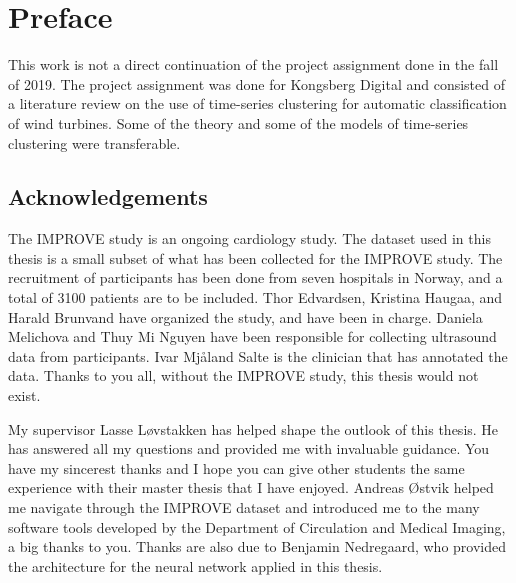 \section*{Preface}
%

This work is not a direct continuation of the project assignment done in the fall of 2019. The project assignment was done for Kongsberg Digital and consisted of a literature review on the use of time-series clustering for automatic classification of wind turbines. Some of the theory and some of the models of time-series clustering were transferable.

\subsection*{Acknowledgements}

The IMPROVE study is an ongoing cardiology study. The dataset used in this thesis is a small subset of what has been collected for the IMPROVE study. The recruitment of participants has been done from seven hospitals in Norway, and a total of 3100 patients are to be included. Thor Edvardsen, Kristina Haugaa, and Harald Brunvand have organized the study, and have been in charge. Daniela Melichova and Thuy Mi Nguyen have been responsible for collecting ultrasound data from participants. Ivar Mjåland Salte is the clinician that has annotated the data. Thanks to you all, without the IMPROVE study, this thesis would not exist. \bigskip

My supervisor Lasse Løvstakken has helped shape the outlook of this thesis. He has answered all my questions and provided me with invaluable guidance. You have my sincerest thanks and I hope you can give other students the same experience with their master thesis that I have enjoyed. Andreas Østvik helped me navigate through the IMPROVE dataset and introduced me to the many software tools developed by the Department of Circulation and Medical Imaging, a big thanks to you. Thanks are also due to Benjamin Nedregaard, who provided the architecture for the neural network applied in this thesis.

\clearpage
